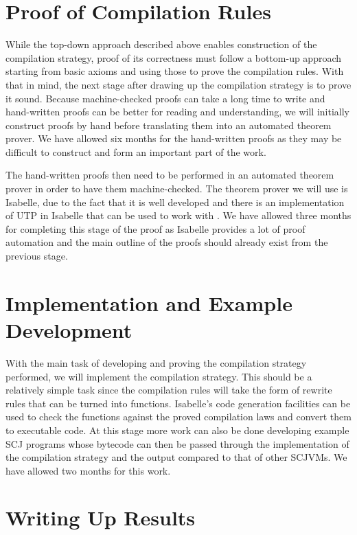 \documentclass[a4paper,10pt]{report}
\begin{document}
\section{Proof of Compilation Rules}

While the top-down approach described above enables construction of
the compilation strategy, proof of its correctness must follow a 
bottom-up approach starting from basic axioms and using
those to prove the compilation rules.
With that in mind, the next stage after drawing up the compilation
strategy is to prove it sound.
Because machine-checked proofs can take a long time to write and
hand-written proofs can be better for reading and understanding,
we will initially construct proofs by hand before translating them
into an automated theorem prover.
We have allowed six months for the hand-written proofs as they may be
difficult to construct and form an important part of the work.

The hand-written proofs then need to be performed in an automated
theorem prover in order to have them machine-checked.
The theorem prover we will use is Isabelle, due to the fact that it is
well developed and there is an implementation of UTP in Isabelle that
can be used to work with \Circus{}.
We have allowed three months for completing this stage of the proof as
Isabelle provides a lot of proof automation and the main outline of
the proofs should already exist from the previous stage.

\section{Implementation and Example Development}

With the main task of developing and proving the compilation strategy
performed, we will implement the compilation strategy.
This should be a relatively simple task since the compilation rules
will take the form of rewrite rules that can be turned into functions.
Isabelle's code generation facilities can be used to check the
functions against the proved compilation laws and convert them to
executable code.
At this stage more work can also be done developing example SCJ
programs whose bytecode can then be passed through the implementation
of the compilation strategy and the output compared to that of other
SCJVMs.
We have allowed two months for this work.

\section{Writing Up Results}
\end{document}
